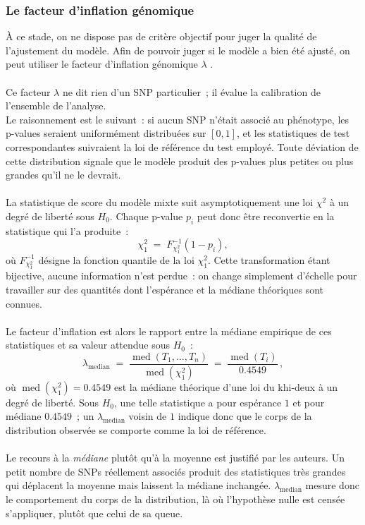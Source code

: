 \documentclass[11pt,a4paper]{article}
\begin{document}
\subsubsection{Le facteur d'inflation génomique}
\label{sec:lambda}
 
À ce stade, on ne dispose pas de critère objectif pour juger la qualité de l'ajustement du modèle.
Afin de pouvoir juger si le modèle a bien été ajusté, on peut utiliser le facteur d'inflation génomique $\lambda$ \cite{lambda}.
\\
\\
Ce facteur $\lambda$ ne dit rien d'un SNP
particulier~; il évalue la calibration de l'ensemble de l'analyse.
\\
Le raisonnement est le suivant~: si aucun SNP n'était associé au phénotype, les
p-values seraient uniformément distribuées sur $[0,1]$, et les statistiques de test correspondantes
suivraient la loi de référence du test employé. Toute déviation de cette distribution
signale que le modèle produit des p-values plus petites ou plus grandes qu'il ne le devrait.
\\
\\
La statistique de score du modèle mixte suit asymptotiquement une loi $\chi^{2}$ à un degré de
liberté sous $H_0$. Chaque p-value $p_i$ peut donc être reconvertie en la statistique qui l'a
produite~:
\[
\chi^{2}_{1} \;=\; F^{-1}_{\chi^{2}_{1}}\!\left(1 - p_i\right),
\]
où $F^{-1}_{\chi^{2}_{1}}$ désigne la fonction quantile de la loi $\chi^{2}_{1}$.
Cette transformation étant bijective, aucune information n'est perdue~: on change simplement
d'échelle pour travailler sur des quantités dont l'espérance et la médiane théoriques sont connues.
\\
\\
Le facteur d'inflation est alors le rapport entre la médiane empirique de ces statistiques et sa
valeur attendue sous $H_0$~:
\[
\lambda_{\text{median}} \;=\;
\frac{\operatorname{med}\left(T_{1}, \dots, T_{n}\right)}
     {\operatorname{med}\left(\chi^{2}_{1}\right)}
\;=\;
\frac{\operatorname{med}\left(T_{i}\right)}{0.4549}\, ,
\]
où $\operatorname{med}(\chi^{2}_{1}) = 0.4549$ est la médiane théorique d'une loi du khi-deux à un
degré de liberté. Sous $H_0$, une telle statistique a pour espérance $1$ et pour médiane $0.4549$~;
un $\lambda_{\text{median}}$ voisin de $1$ indique donc que le corps de la distribution observée se
comporte comme la loi de référence.
\\
\\
Le recours à la \emph{médiane} plutôt qu'à la moyenne est justifié par les auteurs. Un petit nombre de SNPs
réellement associés produit des statistiques très grandes qui déplacent la moyenne mais laissent la
médiane inchangée. $\lambda_{\text{median}}$ mesure donc le comportement du corps de la
distribution, là où l'hypothèse nulle est censée s'appliquer, plutôt que celui de sa queue.
\vspace{1cm}
\end{document}
